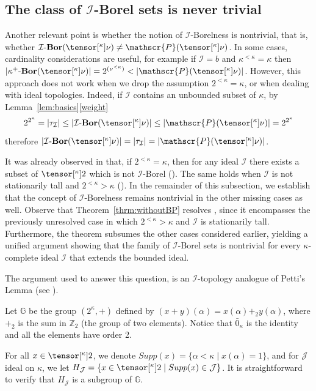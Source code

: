 \documentclass{amsart}
\numberwithin{equation}{section}
\newcommand{\I}{\mathcal{I}}
\newcommand{\pre}[2]{\tensor[^{#1}]{#2}{}}
\newcommand{\1}{\mathbf{I}}
\newcommand{\2}{\mathbf{II}}
\newcommand{\Bor}{\k^+\text{-}\mathbf{Bor}}
\newcommand{\Borid}{\I\text{-}\mathbf{Bor}}
\renewcommand{\k}{\kappa}
\newcommand{\pow}{\mathscr{P}}
\theoremstyle{definition}
\theoremstyle{remark}
\begin{document}
\subsection{The class of \(\I\)-Borel sets is never trivial}\label{subsec:nontrivial}
Another relevant point is whether the notion of \(\I\)-Borelness is nontrivial, that is, whether \(\Borid(\pre{\k}{\nu}) \neq \pow(\pre{\k}{\nu})\). In some cases, cardinality considerations are useful, for example if \(\I=b\) and \(\k^{<\k}=\k\) then \(|\Bor(\pre{\k}{\nu})|=2^{(\nu^{<\k})} <|\pow(\pre{\k}{\nu})|\). 
However, this approach does not work when we drop the assumption \(2^{<\k}=\k\), or when dealing with ideal topologies. Indeed, if \(\I\) contains an unbounded subset of \(\k\), by Lemma~\ref{lem:basics}\ref{weight}
\[ 
2^{2^\k}=|\tau_\I| \leq |\Borid(\pre{\k}{\nu})| \leq |\pow(\pre{\k}{\nu})|=2^{2^\k}
\] 
therefore \(|\Borid(\pre{\k}{\nu})|=|\tau_\I|=|\pow(\pre{\k}{\nu})|\). 



It was already observed in \cite{HKSW22} that, if \(2^{<\k}=\k\), then for any ideal \(\I\) there exists a subset of \(\pre{\k}{2}\) which is not \(\I\)-Borel (\cite[Observation 3.24]{HKSW22}). The same holds when $\I$ is not stationarily tall and \(2^{<\k}>\k\) (\cite[Corollary 3.23]{HKSW22}). 
In the remainder of this subsection, we establish that the concept of \(\I\)-Borelness remains nontrivial in the other missing cases as well. Observe that Theorem~\ref{thrm:withoutBP} resolves \cite[Question 2]{HKSW22}, since it encompasses the previously unresolved case in which \(2^{<\k}>\k\) and \(\I\) is stationarily tall. Furthermore, the theorem subsumes the other cases considered earlier, yielding a unified argument showing that the family of \(\I\)-Borel sets is nontrivial for every \(\k\)-complete ideal \(\I\) that extends the bounded ideal.

The argument used to answer this question, is an $\I$-topology analogue of Petti's Lemma (see \cite[Theorem 9.9]{Kech}).

\medskip



    Let $\mathbb G$ be the group $(2^\kappa,+)$ defined by  $(x+y)(\alpha)=x(\alpha)+_2 y(\alpha)$, where $+_2$ is the sum in $\mathbb{Z}_2$ (the group of two elements). Notice that $\bar 0_\kappa$ is the identity and all the elements have order 2.
    
For all $x\in \pre{\k}{2}$, we denote $Supp(x)=\{\alpha<\kappa\mid x(\alpha)=1\}$, and for $\mathcal J$ ideal on $\kappa$, we let $H_{\mathcal J}=\{x \in \pre{\k}{2}\mid Supp(x)\in \mathcal J\}$. It is straightforward to verify that $H_{\mathcal{J}}$ is a subgroup of $\mathbb G$.
\end{document}
